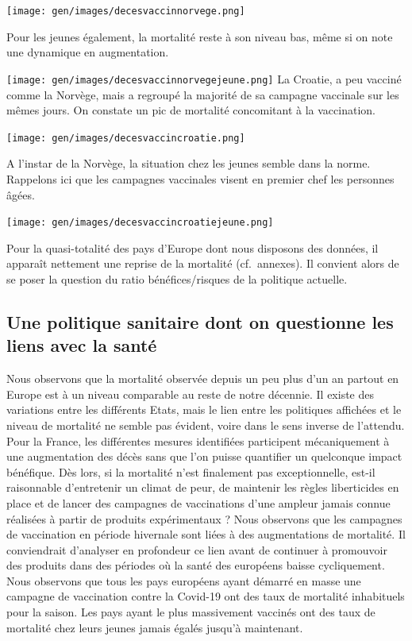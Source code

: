 \documentclass[
]{article}
\begin{document}
\texttt{[image: gen/images/decesvaccinnorvege.png]}

Pour les jeunes également, la mortalité reste à son niveau bas, même si
on note une dynamique en augmentation.

\texttt{[image: gen/images/decesvaccinnorvegejeune.png]}
La Croatie, a peu vacciné comme la Norvège, mais a regroupé la majorité
de sa campagne vaccinale sur les mêmes jours. On constate un pic de
mortalité concomitant à la vaccination.

\texttt{[image: gen/images/decesvaccincroatie.png]}

A l'instar de la Norvège, la situation chez les jeunes semble dans la
norme. Rappelons ici que les campagnes vaccinales visent en premier chef
les personnes âgées.

\texttt{[image: gen/images/decesvaccincroatiejeune.png]}

Pour la quasi-totalité des pays d'Europe dont nous disposons des
données, il apparaît nettement une reprise de la mortalité
(cf.~annexes). Il convient alors de se poser la question du ratio
bénéfices/risques de la politique actuelle.

\hypertarget{une-politique-sanitaire-dont-on-questionne-les-liens-avec-la-santuxe9}{%
\subsection{Une politique sanitaire dont on questionne les liens avec la
santé}\label{une-politique-sanitaire-dont-on-questionne-les-liens-avec-la-santuxe9}}

Nous observons que la mortalité observée depuis un peu plus d'un an
partout en Europe est à un niveau comparable au reste de notre décennie.
Il existe des variations entre les différents Etats, mais le lien entre
les politiques affichées et le niveau de mortalité ne semble pas
évident, voire dans le sens inverse de l'attendu. Pour la France, les
différentes mesures identifiées participent mécaniquement à une
augmentation des décès sans que l'on puisse quantifier un quelconque
impact bénéfique. Dès lors, si la mortalité n'est finalement pas
exceptionnelle, est-il raisonnable d'entretenir un climat de peur, de
maintenir les règles liberticides en place et de lancer des campagnes de
vaccinations d'une ampleur jamais connue réalisées à partir de produits
expérimentaux ? Nous observons que les campagnes de vaccination en
période hivernale sont liées à des augmentations de mortalité. Il
conviendrait d'analyser en profondeur ce lien avant de continuer à
promouvoir des produits dans des périodes où la santé des européens
baisse cycliquement. Nous observons que tous les pays européens ayant
démarré en masse une campagne de vaccination contre la Covid-19 ont des
taux de mortalité inhabituels pour la saison. Les pays ayant le plus
massivement vaccinés ont des taux de mortalité chez leurs jeunes jamais
égalés jusqu'à maintenant.
\end{document}
